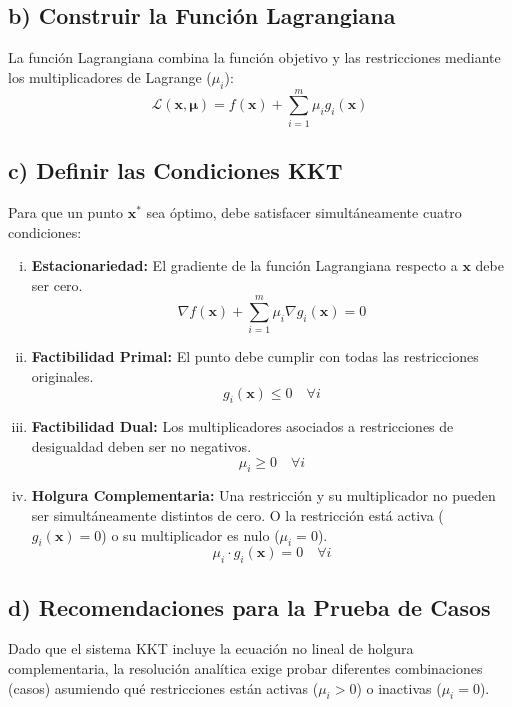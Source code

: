 \documentclass{article}
\begin{document}
	\subsection*{b) Construir la Función Lagrangiana}
	La función Lagrangiana combina la función objetivo y las restricciones mediante los multiplicadores de Lagrange ($\mu_i$):
	$$\mathcal{L}(\mathbf{x}, \boldsymbol{\mu}) = f(\mathbf{x}) + \sum_{i=1}^{m} \mu_i g_i(\mathbf{x})$$
	
	\subsection*{c) Definir las Condiciones KKT}
	Para que un punto $\mathbf{x}^*$ sea óptimo, debe satisfacer simultáneamente cuatro condiciones:
	
	\begin{enumerate}[i)]
		\item \textbf{Estacionariedad:} El gradiente de la función Lagrangiana respecto a $\mathbf{x}$ debe ser cero.
		$$\nabla f(\mathbf{x}) + \sum_{i=1}^{m} \mu_i \nabla g_i(\mathbf{x}) = 0$$
		
		\item \textbf{Factibilidad Primal:} El punto debe cumplir con todas las restricciones originales.
		$$g_i(\mathbf{x}) \leq 0 \quad \forall i$$
		
		\item \textbf{Factibilidad Dual:} Los multiplicadores asociados a restricciones de desigualdad deben ser no negativos.
		$$\mu_i \geq 0 \quad \forall i$$
		
		\item \textbf{Holgura Complementaria:} Una restricción y su multiplicador no pueden ser simultáneamente distintos de cero. O la restricción está activa ($g_i(\mathbf{x}) = 0$) o su multiplicador es nulo ($\mu_i = 0$).
		$$\mu_i \cdot g_i(\mathbf{x}) = 0 \quad \forall i$$
	\end{enumerate}
	
	\subsection*{d) Recomendaciones para la Prueba de Casos}
	Dado que el sistema KKT incluye la ecuación no lineal de holgura complementaria, la resolución analítica exige probar diferentes combinaciones (casos) asumiendo qué restricciones están activas ($\mu_i > 0$) o inactivas ($\mu_i = 0$).
	
\end{document}
